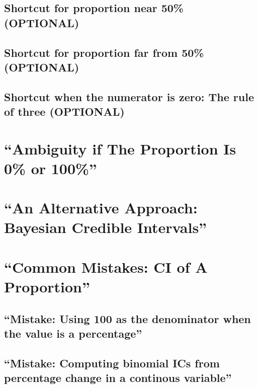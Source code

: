 \documentclass[]{book}
\theoremstyle{definition}
\theoremstyle{definition}
\theoremstyle{definition}
\theoremstyle{remark}
\begin{document}
\subsection{Shortcut for proportion near 50\%
(OPTIONAL)}\label{shortcut-for-proportion-near-50-optional}

\subsection{Shortcut for proportion far from 50\%
(OPTIONAL)}\label{shortcut-for-proportion-far-from-50-optional}

\subsection{Shortcut when the numerator is zero: The rule of three
(OPTIONAL)}\label{shortcut-when-the-numerator-is-zero-the-rule-of-three-optional}

\section{\texorpdfstring{``Ambiguity if The Proportion Is 0\% or
100\%''}{Ambiguity if The Proportion Is 0\% or 100\%}}\label{ambiguity-if-the-proportion-is-0-or-100}

\section{\texorpdfstring{``An Alternative Approach: Bayesian Credible
Intervals''}{An Alternative Approach: Bayesian Credible Intervals}}\label{an-alternative-approach-bayesian-credible-intervals}

\section{\texorpdfstring{``Common Mistakes: CI of A
Proportion''}{Common Mistakes: CI of A Proportion}}\label{common-mistakes-ci-of-a-proportion}

\subsection{\texorpdfstring{``Mistake: Using 100 as the denominator when
the value is a
percentage''}{Mistake: Using 100 as the denominator when the value is a percentage}}\label{mistake-using-100-as-the-denominator-when-the-value-is-a-percentage}

\subsection{\texorpdfstring{``Mistake: Computing binomial ICs from
percentage change in a continous
variable''}{Mistake: Computing binomial ICs from percentage change in a continous variable}}\label{mistake-computing-binomial-ics-from-percentage-change-in-a-continous-variable}
\end{document}
